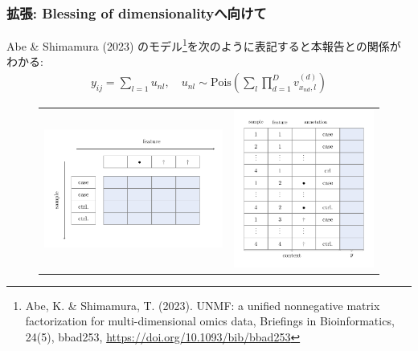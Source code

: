 \documentclass[dvipdfmx, dvipsnames]{beamer}
\begin{document}
\begin{frame}
\frametitle{拡張: Blessing of dimensionalityへ向けて}
Abe \& Shimamura (2023) のモデル\footnote{Abe, K. \& Shimamura, T. (2023). UNMF: a unified nonnegative matrix factorization for multi-dimensional omics data, Briefings in Bioinformatics, 24(5), bbad253, \url{https://doi.org/10.1093/bib/bbad253}}を次のように表記すると本報告との関係がわかる:
\begin{align*}
y_{ij} = \sum_{l=1}u_{nl}, \quad u_{nl} \sim \mathrm{Pois} \left(\sum_{l} \prod_{d=1}^D v^{(d)}_{x_{nd}, l}\right) 
\end{align*}

\begin{figure}
\begin{tabular}{cc}
\includegraphics[height=0.45\textheight]{img/anndata}
&
\includegraphics[height=0.45\textheight]{img/anndata_tidy}
\end{tabular}
\end{figure}
\end{frame}
\end{document}
